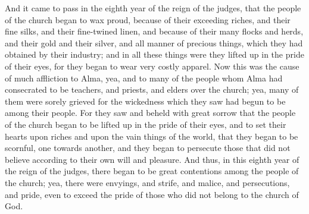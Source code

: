 And it came to pass in the eighth year of the reign of the judges, that the people of the church began to wax proud, because of their exceeding riches, and their fine silks, and their fine-twined linen, and because of their many flocks and herds, and their gold and their silver, and all manner of precious things, which they had obtained by their industry; and in all these things were they lifted up in the pride of their eyes, for they began to wear very costly apparel.
\bverse \iffalse Now this was the cause of much affliction to Alma, yea, and to many of the people whom Alma had consecrated to be teachers, and priests, and elders over the church; yea, many of them were sorely grieved for the wickedness which they saw had begun to be among their people. \fi
Now this was the cause of much affliction to Alma, yea, and to many of the people whom Alma had consecrated to be teachers, and priests, and elders over the church; yea, many of them were sorely grieved for the wickedness which they saw had begun to be among their people.
\bverse \iffalse For they saw and beheld with great sorrow that the people of the church began to be lifted up in the pride of their eyes, and to set their hearts upon riches and upon the vain things of the world, that they began to be scornful, one towards another, and they began to persecute those that did not believe according to their own will and pleasure. \fi
For they saw and beheld with great sorrow that the people of the church began to be lifted up in the pride of their eyes, and to set their hearts upon riches and upon the vain things of the world, that they began to be scornful, one towards another, and they began to persecute those that did not believe according to their own will and pleasure.
\bverse \iffalse And thus, in this eighth year of the reign of the judges, there began to be great contentions among the people of the church; yea, there were envyings, and strife, and malice, and persecutions, and pride, even to exceed the pride of those who did not belong to the church of God. \fi
And thus, in this eighth year of the reign of the judges, there began to be great contentions among the people of the church; yea, there were envyings, and strife, and malice, and persecutions, and pride, even to exceed the pride of those who did not belong to the church of God.
\bverse \iffalse And thus ended the eighth year of the reign of the judges; and the wickedness of the church was a great stumbling-block to those who did not belong to the church; and thus the church began to fail in its progress. \fi
